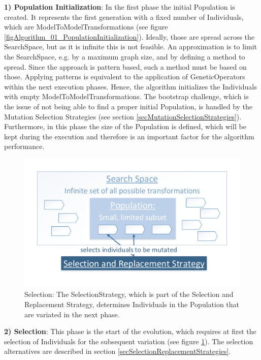 \textbf{1) Population Initialization}: In the first phase the initial \gls{Population} is created. It represents the first generation with a fixed number of \glspl{Individual}, which are \glspl{ModelToModelTransformation} (see figure \ref{figAlgorithm_01_PopulationInitialization}). Ideally, those are spread across the \gls{SearchSpace}, but as it is infinite this is not feasible. An approximation is to limit the \gls{SearchSpace}, e.g. by a maximum graph size, and by defining a method to spread. Since the approach is pattern based, such a method must be based on those. Applying patterns is equivalent to the application of \glspl{GeneticOperator} within the next execution phases. Hence, the algorithm initializes the \glspl{Individual} with empty \glspl{ModelToModelTransformation}. The bootstrap challenge, which is the issue of not being able to find a proper initial \gls{Population}, is handled by the Mutation Selection Strategies (see section \ref{secMutationSelectionStrategies}). Furthermore, in this phase the size of the \gls{Population} is defined, which will be kept during the execution and therefore is an important factor for the algorithm performance.

\begin{figure}[htb]
	\centering
	\includegraphics[scale=0.5, trim=0cm 1cm 0cm 1cm, clip=true]{Images/Algorithm_02_Selection.pdf} 
	\caption{Selection: The \gls{SelectionStrategy}, which is part of the Selection and Replacement Strategy, determines \glspl{Individual} in the \gls{Population} that are variated in the next phase.}
	\label{figAlgorithm_02_Selection}
\end{figure}

\textbf{2) Selection}: This phase is the start of the evolution, which requires at first the selection of \glspl{Individual} for the subsequent variation (see figure \ref{figAlgorithm_02_Selection}). The selection alternatives are described in section \ref{secSelectionReplacementStrategies}.

